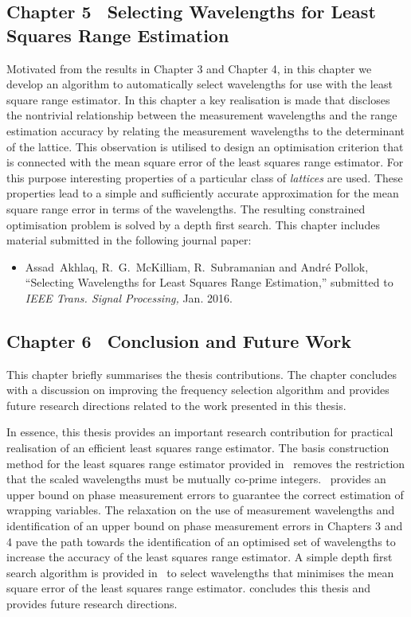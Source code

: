 \subsection*{Chapter 5 \textemdash~Selecting Wavelengths for Least Squares Range Estimation }
Motivated from the results in Chapter 3 and Chapter 4, in this chapter we develop an algorithm to automatically select wavelengths for use with the least square range estimator. In this chapter a key realisation is made that discloses the nontrivial relationship between the measurement wavelengths and the range estimation accuracy by relating the measurement wavelengths to the determinant of the lattice. This observation is utilised to design an optimisation criterion that is connected with the mean square error of the least squares range estimator. For this purpose interesting properties of a particular class of \emph{lattices} are used. These properties lead to a simple and sufficiently accurate approximation for the mean square range error in terms of the wavelengths. The resulting constrained optimisation problem is solved by a depth first search. \newline
This chapter includes material submitted in the following journal paper:
\newline
\begin{itemize}
\item{Assad~Akhlaq, R.~G.~McKilliam, R.~Subramanian and Andr\'e Pollok, ``{Selecting Wavelengths for Least Squares Range Estimation},'' submitted to \emph{IEEE Trans. Signal Processing,}  Jan. 2016.}
\end{itemize}

\subsection*{Chapter 6 \textemdash~Conclusion and Future Work}
This chapter briefly summarises the thesis contributions. The chapter concludes with a discussion on improving the frequency selection algorithm and provides future research directions related to the work presented in this thesis.

In essence, this thesis provides an important research contribution for practical realisation of an efficient least squares range estimator. The basis construction method for the least squares range estimator provided in~ removes the restriction that the scaled wavelengths must be mutually co-prime integers.~ provides an upper bound on phase measurement errors to guarantee the correct estimation of wrapping variables. The relaxation on the use of measurement wavelengths and identification of an upper bound on phase measurement errors in Chapters 3 and 4 pave the path towards the identification of an optimised set of wavelengths to increase the accuracy of the least squares range estimator. A simple depth first search algorithm is provided in~ to select wavelengths that minimises the mean square error of the least squares range estimator.  concludes this thesis and provides future research directions.
